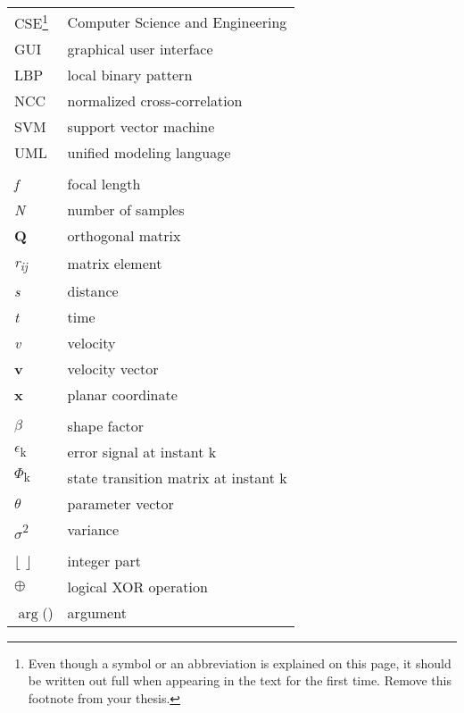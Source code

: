 \header{\headerabbreviations}
\setlongtables
\begin{longtable}[l]{p{3cm}p{}}

    CSE\footnote{Even though a symbol or an abbreviation is explained on this page, it should be written out full when appearing in the text for the first time. Remove this footnote from your thesis.} & Computer Science and Engineering\\
    GUI & graphical user interface\\
    LBP & local binary pattern\\
    NCC & normalized cross-correlation\\
    SVM & support vector machine\\
    UML & unified modeling language \\
    \\
    \textit{f} & focal length\\
    \textit{N} & number of samples\\
    \textbf{Q} & orthogonal matrix \\
    \textit{r\textsubscript{ij}} & matrix element \\
    \textit{s} & distance \\
    \textit{t} & time \\
    \textit{v} & velocity \\
    \textbf{v} & velocity vector \\
    \textbf{x} & planar coordinate \\
    \\
    $\beta$ & shape factor \\
    $\epsilon$\textsubscript{k} & error signal at instant k \\
    \textbf{$\Phi$}\textsubscript{k} & state transition matrix at instant k \\
    \textbf{$\theta$} & parameter vector \\
    $\sigma$\textsuperscript{2} & variance \\
    \\
    $\lfloor$ $\rfloor$ & integer part \\
    $\oplus$ & logical XOR operation \\
    $\arg$() & argument \\

\end{longtable}
\setcounter{table}{0}

